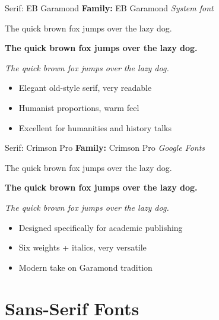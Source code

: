 \documentclass[10pt]{beamer}
\begin{document}
\setmainfont{EB Garamond}

\begin{frame}{Serif: EB Garamond}
  \textbf{Family:} EB Garamond \hfill \textit{System font}

  \vspace{0.3cm}
  {\Large The quick brown fox jumps over the lazy dog.}

  \vspace{0.2cm}
  \textbf{The quick brown fox jumps over the lazy dog.}

  \vspace{0.2cm}
  \textit{The quick brown fox jumps over the lazy dog.}

  \vspace{0.3cm}
  \begin{itemize}
    \item Elegant old-style serif, very readable
    \item Humanist proportions, warm feel
    \item Excellent for humanities and history talks
  \end{itemize}
\end{frame}

\setmainfont{Crimson Pro}

\begin{frame}{Serif: Crimson Pro}
  \textbf{Family:} Crimson Pro \hfill \textit{Google Fonts}

  \vspace{0.3cm}
  {\Large The quick brown fox jumps over the lazy dog.}

  \vspace{0.2cm}
  \textbf{The quick brown fox jumps over the lazy dog.}

  \vspace{0.2cm}
  \textit{The quick brown fox jumps over the lazy dog.}

  \vspace{0.3cm}
  \begin{itemize}
    \item Designed specifically for academic publishing
    \item Six weights + italics, very versatile
    \item Modern take on Garamond tradition
  \end{itemize}
\end{frame}

\section{Sans-Serif Fonts}
\end{document}
